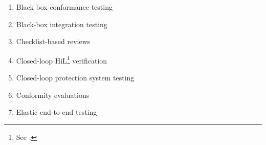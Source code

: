 \begin{enumerate}
    \item Black box conformance testing \citep[p.~25]{JardEtAl1999}
    \item Black-box integration testing \citep[pp.~345\==346]{SakamotoEtAl2013}
    \item Checklist-based reviews \citepISTQB{}
    \item Closed-loop HiL\footnote{See .} verification \citep[p.~6]{PreußeEtAl2012}
    \item Closed-loop protection system testing \citep[p.~331]{ForsythEtAl2004}
    \item Conformity evaluations \citep{ISO_IEC2014}
    \item Elastic end-to-end testing \citep[p.~93:30]{BertolinoEtAl2019}

\end{enumerate}
